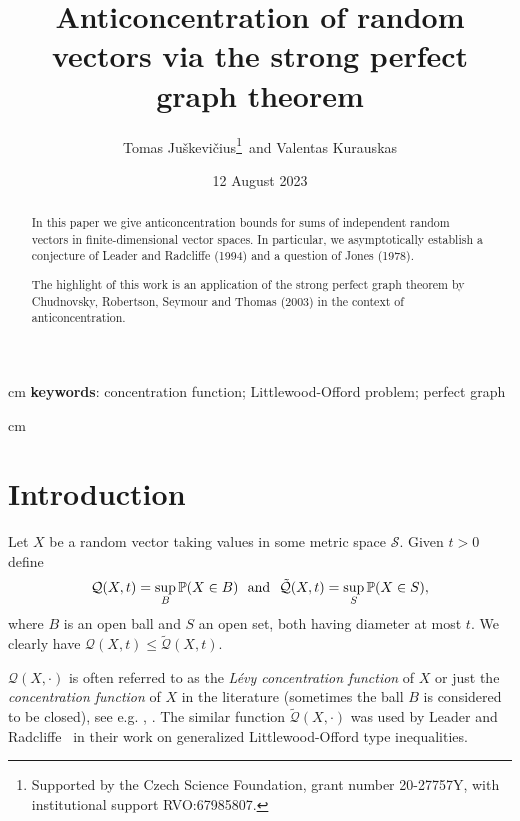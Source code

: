 \documentclass{article}
\newcommand{\pr}{\mathbb P}
\newcommand{\conc}{\mathcal{Q}}
\newcommand{\concdiam}{\tilde{\mathcal{Q}}}
\begin{document}
\title{Anticoncentration of random vectors via the strong perfect graph theorem}

\author{Tomas Juškevičius\footnote{Supported by the Czech Science Foundation, grant number 20-27757Y, with institutional support RVO:67985807.}\, and Valentas Kurauskas}

\date{12 August 2023}

\maketitle


\begin{abstract}
    In this paper we give anticoncentration bounds for sums of independent random vectors in finite-dimensional vector spaces. In particular, we asymptotically establish a conjecture of Leader and Radcliffe (1994) and a question of 
Jones (1978). 

    The highlight of this work is an application of the strong perfect graph theorem by Chudnovsky, Robertson, Seymour and Thomas (2003) in the context of anticoncentration.
\end{abstract}

\bigskip

 cm 
\textbf{keywords}: concentration function; Littlewood-Offord problem; perfect graph

 cm



\maketitle


\section {Introduction}
\label{sec.introduction}

Let $X$ be a random vector taking values in some metric space $\mathcal{S}$. Given $t>0$ define  
$$\conc(X, t)=\sup_B \pr(X \in B)\text{\,\,\,\,and\,\,\,\,} \concdiam(X,t) = \sup_S \pr(X \in S),$$ 
where $B$ is an open ball and $S$ an open set, both having diameter at most $t$. We clearly have $\conc(X, t) \le \concdiam(X,t)$.

$\conc(X, \cdot)$ is often referred to as the \textit{L\'{e}vy concentration function} of $X$ or just the \textit{concentration function} of $X$ in the literature (sometimes the ball $B$ is considered to be closed), see e.g. \cite{Levy}, \cite{Bobkov}. The similar function $\concdiam(X, \cdot)$ was used by Leader and Radcliffe~\cite{LR}
in their work on generalized Littlewood-Offord type inequalities.
\end{document}
